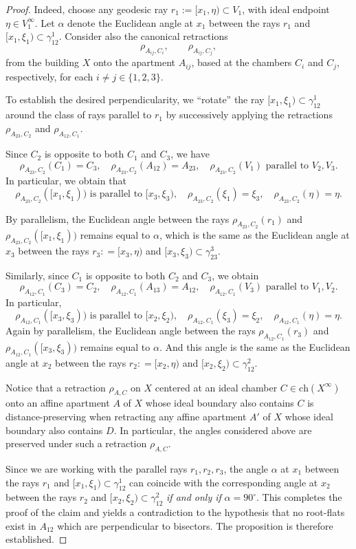 \documentclass[11pt]{amsart}
\newcommand{\Ch}{\mathrm{ch}}
\theoremstyle{plain}
\theoremstyle{definition}
\theoremstyle{remark}
\begin{document}
\begin{proof}
		Indeed, choose any geodesic ray $r_1 := [x_1, \eta) \subset V_1$, with ideal endpoint $\eta \in V_1^{\infty}$. Let $\alpha$ denote the Euclidean angle at $x_1$ between the rays $r_1$ and $[x_1, \xi_1) \subset \gamma^{1}_{12}$.  Consider also the canonical retractions
		\[
		\rho_{A_{ij}, C_i}, \qquad \rho_{A_{ij}, C_j},
		\]
		from the building $X$ onto the apartment $A_{ij}$, based at the chambers $C_i$ and $C_j$, respectively, for each $i \neq j \in \{1,2,3\}$.
		
		To establish the desired perpendicularity, we ``rotate'' the ray $[x_1, \xi_1) \subset \gamma^{1}_{12}$ around the class of rays parallel to $r_1$ by successively applying the retractions $\rho_{A_{23}, C_2}$ and $\rho_{A_{12}, C_1}$.  
		
		
		Since $C_2$ is opposite to both $C_1$ and $C_3$, we have
		\[
		\rho_{A_{23}, C_2}(C_1) = C_3, \quad  \rho_{A_{23}, C_2}(A_{12}) = A_{23}, \quad  \rho_{A_{23}, C_2}(V_1) \text{ parallel to } V_2, V_3.
		\]
		In particular, we obtain that  
		$$\rho_{A_{23}, C_2}([x_1, \xi_1)) \text{ is parallel to } [x_3, \xi_3), \quad \rho_{A_{23}, C_2}(\xi_1)=\xi_3, \quad  \rho_{A_{23}, C_2}(\eta)=\eta.$$
		
		By parallelism, the Euclidean angle between the rays $\rho_{A_{23}, C_2}(r_1)$ and $\rho_{A_{23}, C_2}([x_1, \xi_1))$ remains equal to $\alpha$, which is the same as the Euclidean angle at $x_3$ between the rays $r_3: =  [x_3, \eta)$ and $[x_3, \xi_3) \subset \gamma^{3}_{23}$.
		
		
		\medskip
		Similarly, since $C_1$ is opposite to both $C_2$ and $C_3$, we obtain
		\[
		\rho_{A_{12}, C_1}(C_3) = C_2, \quad \rho_{A_{12}, C_1}(A_{13}) = A_{12}, \quad  \rho_{A_{12}, C_1}(V_3) \text{ parallel to } V_1, V_2.
		\]
		In particular,
		$$\rho_{A_{12}, C_1}([x_3, \xi_3)) \text{ is parallel to } [x_2, \xi_2), \quad \rho_{A_{12}, C_1}(\xi_3)=\xi_2, \quad  \rho_{A_{12}, C_1}(\eta)=\eta.$$
		Again by parallelism, the Euclidean angle between the rays $\rho_{A_{12}, C_1}(r_3)$ and $\rho_{A_{12}, C_1}([x_3, \xi_3))$ remains equal to $\alpha$. And this angle is the same as the Euclidean angle at $x_2$ between the rays $r_2: =  [x_2, \eta)$ and $[x_2, \xi_2) \subset \gamma^{2}_{12}$. 
		
		Notice that a retraction $\rho_{A,C}$ on $X$ centered at an ideal chamber \( C  \in \Ch(X^\infty)\) onto an affine apartment $A$ of $X$ whose ideal boundary also contains \( C\) is distance-preserving when retracting any affine apartment $A'$ of \( X \) whose ideal boundary also contains \( D \). In particular, the angles considered above are preserved under such a retraction $\rho_{A,C}$.
		
		\medskip
		Since we are working with the parallel rays $r_1, r_2, r_3$, the angle $\alpha$ at $x_1$ between the rays
		$r_1$ and $[x_1, \xi_1) \subset \gamma^{1}_{12}$ can coincide with the  corresponding angle at $x_2$ between the rays $r_2$ and $[x_2, \xi_2) \subset
		\gamma^{2}_{12}$ \emph{if and only if} $\alpha = 90^\circ$.  This completes the proof of the claim and yields a contradiction to the
		hypothesis that no root-flats exist in $A_{12}$ which are perpendicular to bisectors. The proposition is therefore established.
	\end{proof}
	
\end{document}
